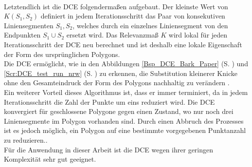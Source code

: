{ \\ 
 Letztendlich ist die DCE folgendermaßen aufgebaut. Der kleinste Wert von $K(S_1,S_2)$ definiert in jedem Iterationsschritt das Paar von konsekutiven Liniensegmenten $S_1, S_2$, welches durch ein einzelnes Liniensegment von den Endpunkten $S_1 \cup S_2$ ersetzt wird. Das Relevanzmaß $K$ wird lokal für jeden Iterationsschritt der DCE neu berechnet und ist deshalb eine lokale Eigenschaft der Form des ursprünglichen Polygons. \\ Die DCE ermöglicht, wie in den Abbildungen \ref{Bsp_DCE_Bark_Paper} (S. \pageref{Bsp_DCE_Bark_Paper}) und \ref{Scr:DCE_test_run_nrw} (S. \pageref{Scr:DCE_test_run_nrw}) zu erkennen, die Substitution kleinerer Knicke ohne den Gesamteindruck der Form des Polygons nachhaltig zu verändern \citep{Barkowsky2000}.
 \\
 Ein weiterer Vorteil dieses Algorithmus ist, dass er immer terminiert, da in jedem Iterationsschritt die Zahl der Punkte um eins reduziert wird. Die DCE konvergiert für geschlossene Polygone gegen einen Zustand, wo nur noch drei Liniensegmente im Polygon vorhanden sind. Durch einen Abbruch des Prozesses ist es jedoch möglich, ein Polygon auf eine bestimmte vorgegebenen Punktanzahl zu reduzieren.\citep{Barkowsky2000}. \\ 
Für die Anwendung in dieser Arbeit ist die DCE wegen ihrer geringen Komplexität sehr gut geeignet.
}


